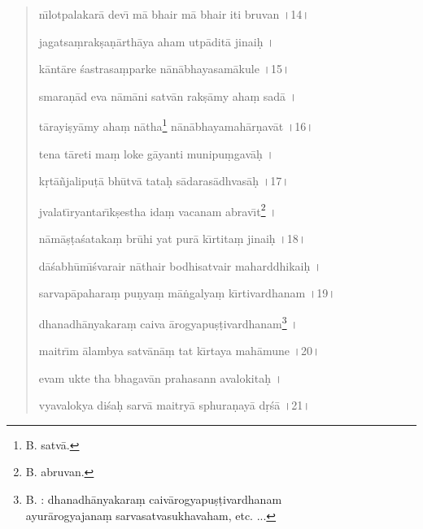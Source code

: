 \documentclass[a4paper, 11pt, oneside, french]{article}
\begin{document}
\begin{quotation}
n\={\i}lotpalakar\={a} dev\={\i} m\={a} bhair m\={a} bhair iti bruvan \texthindi{।}14\texthindi{।}

\bigskip

jagatsa\d{m}rak\d{s}a\d{n}\={a}rth\={a}ya aham utp\={a}dit\={a} jinai\d{h} \texthindi{।}

k\={a}nt\={a}re \'{s}astrasa\d{m}parke n\={a}n\={a}bhayasam\={a}kule \texthindi{।}15\texthindi{।}

\bigskip

smara\d{n}\={a}d eva n\={a}m\={a}ni satv\={a}n rak\d{s}\={a}my aha\d{m} sad\={a} \texthindi{।}

t\={a}rayi\d{s}y\={a}my aha\d{m} n\={a}tha\footnote{B. satv\={a}.} n\={a}n\={a}bhayamah\={a}r\d{n}av\={a}t \texthindi{।}16\texthindi{।}

\bigskip

tena t\={a}reti ma\d{m} loke g\={a}yanti munipu\d{m}gav\={a}\d{h} \texthindi{।}

k\d{r}t\={a}\~{n}jalipu\d{t}\={a} bh\={u}tv\={a} tata\d{h} s\={a}daras\={a}dhvas\={a}\d{h} \texthindi{।}17\texthindi{।}

\bigskip

jvalat\={\i}ryantar\={\i}k\d{s}estha ida\d{m} vacanam abrav\={\i}t\footnote{B. abruvan.} \texthindi{।}

n\={a}m\={a}\d{s}\d{t}a\'{s}ataka\d{m} br\={u}hi yat pur\={a} k\={\i}rtita\d{m} jinai\d{h} \texthindi{।}18\texthindi{।}

\bigskip

d\={a}\'{s}abh\={u}m\={\i}\'{s}varair n\={a}thair bodhisatvair maharddhikai\d{h} \texthindi{।}

sarvap\={a}pahara\d{m} pu\d{n}ya\d{m} m\={a}\.{n}galya\d{m} k\={\i}rtivardhanam \texthindi{।}19\texthindi{।}

\bigskip

dhanadh\={a}nyakara\d{m} caiva \={a}rogyapu\d{s}\d{t}ivardhanam\footnote{B. : dhanadh\={a}nyakara\d{m} caiv\={a}rogyapu\d{s}\d{t}ivardhanam\\\hspace*{10mm}ayur\={a}rogyajana\d{m} sarvasatvasukhavaham, etc. ...} \texthindi{।}

maitr\={\i}m \={a}lambya satv\={a}n\={a}\d{m} tat k\={\i}rtaya mah\={a}mune \texthindi{।}20\texthindi{।}

\bigskip

evam ukte tha bhagav\={a}n prahasann avalokita\d{h} \texthindi{।}

vyavalokya di\'{s}a\d{h} sarv\={a} maitry\={a} sphura\d{n}ay\={a} d\d{r}\'{s}\={a} \texthindi{।}21\texthindi{।}


\end{quotation}
\end{document}
